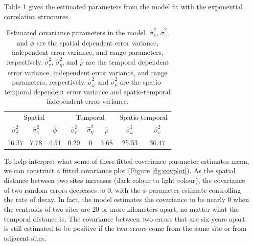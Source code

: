 \documentclass[smallextended]{svjour3}       %
\begin{document}
Table \ref{tab:paramest} gives the estimated parameters from the model
fit with the exponential correlation structures.

\begin{table}[H]

\caption{\label{tab:paramest}Estimated covariance parameters in the model. $\hat{\sigma}^2_{\delta}$, $\hat{\sigma}^2_{\gamma}$, and $\hat{\phi}$ are the spatial dependent error variance, independent error variance, and range parameters, respectively. $\hat{\sigma}^2_{\tau}$, $\hat{\sigma}^2_{\eta}$, and $\hat{\rho}$ are the temporal dependent error variance, independent error variance, and range parameters, respectively. $\hat{\sigma}^2_{\omega}$ and $\hat{\sigma}^2_{\nu}$ are the spatio-temporal dependent error variance and spatio-temporal independent error variance.}
\centering
\begin{tabular}[t]{cccccccc}
\toprule
\multicolumn{3}{c}{Spatial} & \multicolumn{3}{c}{Temporal} & \multicolumn{2}{c}{Spatio-temporal} \\
\cmidrule(l{3pt}r{3pt}){1-3} \cmidrule(l{3pt}r{3pt}){4-6} \cmidrule(l{3pt}r{3pt}){7-8}
$\hat{\sigma}^2_{\delta}$ & $\hat{\sigma}^2_{\gamma}$ & $\hat{\phi}$ & $\hat{\sigma}^2_{\tau}$ & $\hat{\sigma}^2_{\eta}$ & $\hat{\rho}$ & $\hat{\sigma}^2_{\omega}$ & $\hat{\sigma}^2_{\nu}$\\
\midrule
16.37 & 7.78 & 4.51 & 0.29 & 0 & 3.68 & 25.53 & 36.47\\
\bottomrule
\end{tabular}
\end{table}

To help interpret what some of these fitted covariance parameter
estimates mean, we can construct a fitted covariance plot (Figure
\ref{fig:covplot}). As the spatial distance between two sites increases
(dark colour to light colour), the covariance of two random errors
decreases to 0, with the \(\hat{\phi}\) parameter estimate controlling
the rate of decay. In fact, the model estimates the covariance to be
nearly 0 when the centroids of two sites are 20 or more kilometers
apart, no matter what the temporal distance is. The covariance between
two errors that are six years apart is still estimated to be positive if
the two errors come from the same site or from adjacent sites.
\end{document}
